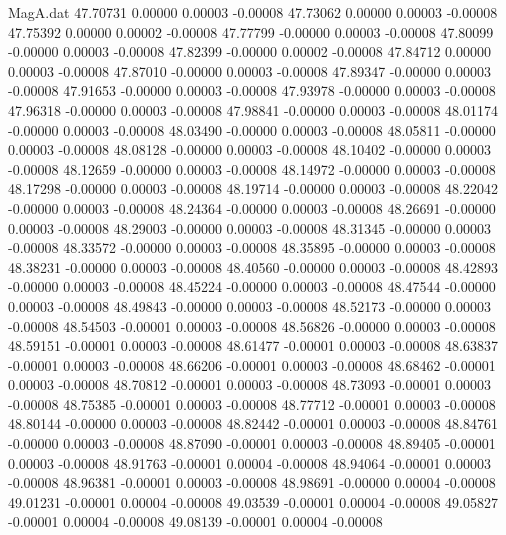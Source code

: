\begin{filecontents}{MagA.dat}
  47.70731    0.00000    0.00003   -0.00008
  47.73062    0.00000    0.00003   -0.00008
  47.75392    0.00000    0.00002   -0.00008
  47.77799   -0.00000    0.00003   -0.00008
  47.80099   -0.00000    0.00003   -0.00008
  47.82399   -0.00000    0.00002   -0.00008
  47.84712    0.00000    0.00003   -0.00008
  47.87010   -0.00000    0.00003   -0.00008
  47.89347   -0.00000    0.00003   -0.00008
  47.91653   -0.00000    0.00003   -0.00008
  47.93978   -0.00000    0.00003   -0.00008
  47.96318   -0.00000    0.00003   -0.00008
  47.98841   -0.00000    0.00003   -0.00008
  48.01174   -0.00000    0.00003   -0.00008
  48.03490   -0.00000    0.00003   -0.00008
  48.05811   -0.00000    0.00003   -0.00008
  48.08128   -0.00000    0.00003   -0.00008
  48.10402   -0.00000    0.00003   -0.00008
  48.12659   -0.00000    0.00003   -0.00008
  48.14972   -0.00000    0.00003   -0.00008
  48.17298   -0.00000    0.00003   -0.00008
  48.19714   -0.00000    0.00003   -0.00008
  48.22042   -0.00000    0.00003   -0.00008
  48.24364   -0.00000    0.00003   -0.00008
  48.26691   -0.00000    0.00003   -0.00008
  48.29003   -0.00000    0.00003   -0.00008
  48.31345   -0.00000    0.00003   -0.00008
  48.33572   -0.00000    0.00003   -0.00008
  48.35895   -0.00000    0.00003   -0.00008
  48.38231   -0.00000    0.00003   -0.00008
  48.40560   -0.00000    0.00003   -0.00008
  48.42893   -0.00000    0.00003   -0.00008
  48.45224   -0.00000    0.00003   -0.00008
  48.47544   -0.00000    0.00003   -0.00008
  48.49843   -0.00000    0.00003   -0.00008
  48.52173   -0.00000    0.00003   -0.00008
  48.54503   -0.00001    0.00003   -0.00008
  48.56826   -0.00000    0.00003   -0.00008
  48.59151   -0.00001    0.00003   -0.00008
  48.61477   -0.00001    0.00003   -0.00008
  48.63837   -0.00001    0.00003   -0.00008
  48.66206   -0.00001    0.00003   -0.00008
  48.68462   -0.00001    0.00003   -0.00008
  48.70812   -0.00001    0.00003   -0.00008
  48.73093   -0.00001    0.00003   -0.00008
  48.75385   -0.00001    0.00003   -0.00008
  48.77712   -0.00001    0.00003   -0.00008
  48.80144   -0.00000    0.00003   -0.00008
  48.82442   -0.00001    0.00003   -0.00008
  48.84761   -0.00000    0.00003   -0.00008
  48.87090   -0.00001    0.00003   -0.00008
  48.89405   -0.00001    0.00003   -0.00008
  48.91763   -0.00001    0.00004   -0.00008
  48.94064   -0.00001    0.00003   -0.00008
  48.96381   -0.00001    0.00003   -0.00008
  48.98691   -0.00000    0.00004   -0.00008
  49.01231   -0.00001    0.00004   -0.00008
  49.03539   -0.00001    0.00004   -0.00008
  49.05827   -0.00001    0.00004   -0.00008
  49.08139   -0.00001    0.00004   -0.00008

\end{filecontents}
